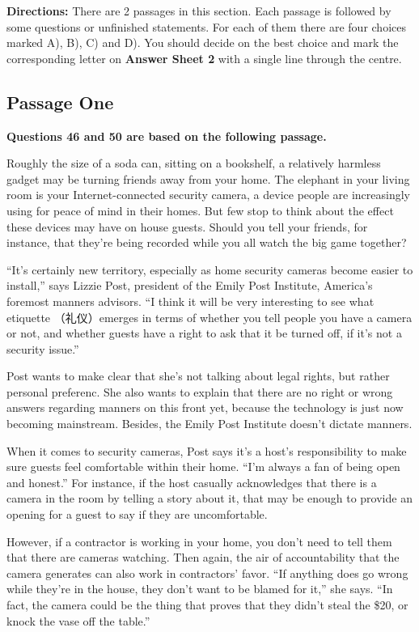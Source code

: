 \documentclass[UTF8,11pt]{ctexart}
\begin{document}
\textbf{Directions:} There are 2 passages in this section. Each passage is followed by some questions or unfinished statements. For each of them there are four choices marked A), B), C) and D). You should decide on the best choice and mark the corresponding letter on\textbf{ Answer Sheet 2} with a single line through the centre.


\subsection*{\textbf{Passage One}}


\textbf{Questions 46 and 50 are based on the following passage.}


Roughly the size of a soda can, sitting on a bookshelf, a relatively harmless gadget may be turning friends away from your home. The elephant in your living room is your Internet-connected security camera, a device people are increasingly using for peace of mind in their homes. But few stop to think about the effect these devices may have on house guests. Should you tell your friends, for instance, that they're being recorded while you all watch the big game together?


“It's certainly new territory, especially as home security cameras become easier to install,” says Lizzie Post, president of the Emily Post Institute, America's foremost manners advisors. “I think it will be very interesting to see what etiquette （礼仪）emerges in terms of whether you tell people you have a camera or not, and whether guests have a right to ask that it be turned off, if it's not a security issue.”


Post wants to make clear that she's not talking about legal rights, but rather personal preferenc. She also wants to explain that there are no right or wrong answers regarding manners on this front yet, because the technology is just now becoming mainstream. Besides, the Emily Post Institute doesn't dictate manners.


When it comes to security cameras, Post says it's a host's responsibility to make sure guests feel comfortable within their home. “I'm always a fan of being open and honest.” For instance, if the host casually acknowledges that there is a camera in the room by telling a story about it, that may be enough to provide an opening for a guest to say if they are uncomfortable.


However, if a contractor is working in your home, you don't need to tell them that there are cameras watching. Then again, the air of accountability that the camera generates can also work in contractors' favor. “If anything does go wrong while they're in the house, they don't want to be blamed for it,” she says. “In fact, the camera could be the thing that proves that they didn't steal the \$20, or knock the vase off the table.”
\end{document}
